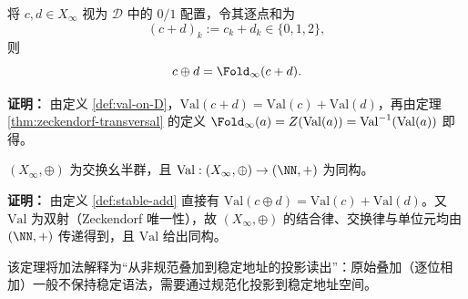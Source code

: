 \begin{corollary}\label{cor:add-as-fold}
将 $c,d\in X_\infty$ 视为 $\mathcal{D}$ 中的 $0/1$ 配置，令其逐点和为
\[
(c+d)_k:=c_k+d_k\in\{0,1,2\},
\]
则
\[
c\oplus d=\Fold_\infty(c+d).
\]
\end{corollary}

\textbf{证明：}
由定义 \ref{def:val-on-D}，$\mathrm{Val}(c+d)=\mathrm{Val}(c)+\mathrm{Val}(d)$，再由定理 \ref{thm:zeckendorf-transversal} 的定义 $\Fold_\infty(a)=Z(\mathrm{Val}(a))=\mathrm{Val}^{-1}(\mathrm{Val}(a))$ 即得。

\begin{theorem}\label{thm:add-definitional}
$(X_\infty,\oplus)$ 为交换幺半群，且 $\mathrm{Val}:(X_\infty,\oplus)\to(\NN,+)$ 为同构。
\end{theorem}

\textbf{证明：}
由定义 \ref{def:stable-add} 直接有 $\mathrm{Val}(c\oplus d)=\mathrm{Val}(c)+\mathrm{Val}(d)$。又 $\mathrm{Val}$ 为双射（Zeckendorf 唯一性），故 $(X_\infty,\oplus)$ 的结合律、交换律与单位元均由 $(\NN,+)$ 传递得到，且 $\mathrm{Val}$ 给出同构。

该定理将加法解释为“从非规范叠加到稳定地址的投影读出”：原始叠加（逐位相加）一般不保持稳定语法，需要通过规范化投影到稳定地址空间。

